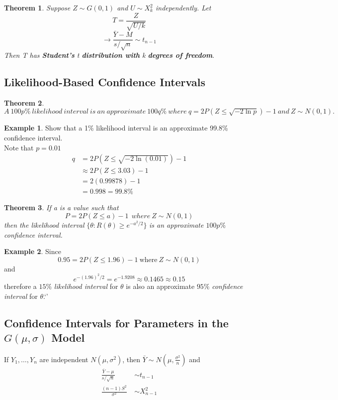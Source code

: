 \documentclass[12pt, leqno]{article}
\theoremstyle{definition}
\newtheorem*{theorem}{Theorem}
\newtheorem{ex}{Example}[section]
\begin{document}
  \begin{theorem}
    \emph{Suppose $Z \sim G(0,1)$ and $U \sim X_{k}^{2}$ independently. Let}
    $$T = \frac{Z}{\sqrt{U / k}}$$
    $$\rightarrow \frac{\bar{Y} - M}{s / \sqrt{n}} \sim t_{n-1}$$
    \emph{Then T has \textbf{Student's} t \textbf{distribution with} k \bf{degrees of freedom}}.
  \end{theorem}

  \subsection{Likelihood-Based Confidence Intervals}
  \begin{theorem}
    $A~100p\%~likelihood~interval~is~an~approximate~100q\%~where~q = 2P(Z \leq \sqrt{-2\ln p}) - 1~and~Z \sim N(0,1).$
  \end{theorem}

  \begin{ex}
    Show that a 1\% likelihood interval is an approximate 99.8\% confidence interval. \\
    Note that $p = 0.01$
    \begin{align*}
      q &= 2P(Z \leq \sqrt{-2\ln(0.01)}) - 1 \\
        &\approx 2P(Z \leq 3.03) - 1 \\
        &= 2(0.99878) - 1 \\
        &= 0.998 = 99.8\%
    \end{align*}
  \end{ex}

  \begin{theorem}
    \emph{If a is a value such that}
    $$P = 2P(Z \leq a) - 1 ~~ where ~ Z \sim N(0,1)$$
    \emph{then the likelihood interval }$\{\theta : R(\theta) \geq e^{-a^{2}/2}\}$ \emph{is an approximate $100p\%$ confidence interval.}
  \end{theorem}

  \begin{ex}
    Since
    $$0.95 = 2P(Z \leq 1.96) - 1 ~\text{where}~Z\sim N(0,1)$$
    and
    $$e^{-(1.96)^{2}/2} = e^{-1.9208} \approx 0.1465 \approx 0.15$$
    therefore a $15\%$ \emph{likelihood interval} for $\theta$ is also an approximate $95\%$ \emph{confidence interval} for $\theta$.`'
  \end{ex}

  \subsection{Confidence Intervals for Parameters in the $G(\mu, \sigma)$ Model}
  If $Y_{1}, \dots, Y_{n}$ are independent $N(\mu, \sigma^{2})$, then $\bar{Y} \sim N(\mu, \frac{\sigma^{2}}{n})$ and
  \begin{align}
     \frac{\bar{Y} - \mu}{s / \sqrt{n}}~ &\sim t_{n-1} \\
     \frac{(n-1)S^{2}}{\sigma^{2}} ~&\sim X_{n-1}^{2}
  \end{align}
\end{document}
